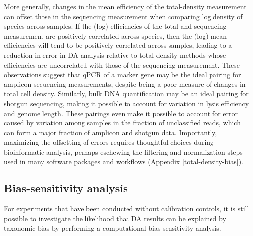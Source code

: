 \documentclass[
]{article}
\begin{document}
More generally, changes in the mean efficiency of the total-density measurement can offset those in the sequencing measurement when comparing log density of species across samples.
If the (log) efficiencies of the total and sequencing measurement are positively correlated across species, then the (log) mean efficiencies will tend to be positively correlated across samples, leading to a reduction in error in DA analysis relative to total-density methods whose efficiencies are uncorrelated with those of the sequencing measurement.
These observations suggest that qPCR of a marker gene may be the ideal pairing for amplicon sequencing measurements, despite being a poor measure of changes in total cell density.
Similarly, bulk DNA quantification may be an ideal pairing for shotgun sequencing, making it possible to account for variation in lysis efficiency and genome length.
These pairings even make it possible to account for error caused by variation among samples in the fraction of unclassified reads, which can form a major fraction of amplicon and shotgun data.
Importantly, maximizing the offsetting of errors requires thoughtful choices during bioinformatic analysis, perhaps eschewing the filtering and normalization steps used in many software packages and workflows (Appendix \ref{total-density-bias}).

\hypertarget{bias-sensitivity-analysis}{%
\subsection{Bias-sensitivity analysis}\label{bias-sensitivity-analysis}}

For experiments that have been conducted without calibration controls, it is still possible to investigate the likelihood that DA results can be explained by taxonomic bias by performing a computational bias-sensitivity analysis.
\end{document}
